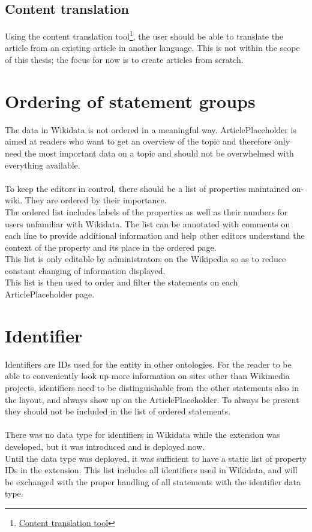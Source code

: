 \subsection{Content translation}
Using the content translation tool\footnote{\href{https://www.mediawiki.org/wiki/Content_translation}{Content translation tool}}, the user should be able to translate the article from an existing article in another language. This is not within the scope of this thesis; the focus for now is to create articles from scratch. \\

\section{Ordering of statement groups}
The data in Wikidata is not ordered in a meaningful way. ArticlePlaceholder is aimed at readers who want to get an overview of the topic and therefore only need the most important data on a topic and should not be overwhelmed with everything available. \\
\\
To keep the editors in control, there should be a list of properties maintained on-wiki. They are ordered by their importance. \\
The ordered list includes labels of the properties as well as their numbers for users unfamiliar with Wikidata. The list can be annotated with comments on each line to provide additional information and help other editors understand the context of the property and its place in the ordered page. \\
This list is only editable by administrators on the Wikipedia so as to reduce constant changing of information displayed. \\
This list is then used to order and filter the statements on each ArticlePlaceholder page. 

\section {Identifier}
Identifiers are IDs used for the entity in other ontologies. For the reader to be able to conveniently look up more information on sites other than Wikimedia projects, identifiers need to be distinguishable from the other statements also in the layout, and always show up on the ArticlePlaceholder. To always be present they should not be included in the list of ordered statements. \\
\\
There was no data type for identifiers in Wikidata while the extension was developed, but it was introduced and is deployed now. \\
Until the data type was deployed, it was sufficient to have a static list of property IDs in the extension. This list includes all identifiers used in Wikidata, and will be exchanged with the proper handling of all statements with the identifier data type.

